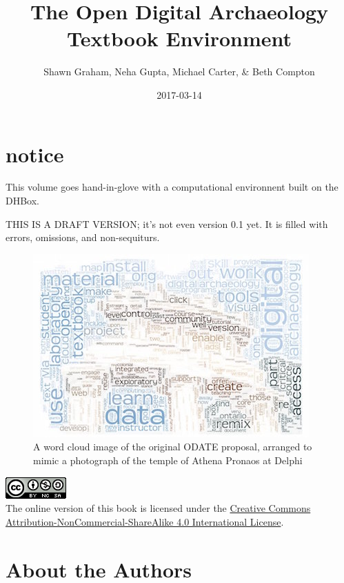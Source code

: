 \documentclass[english,]{book}
\title{The Open Digital Archaeology Textbook Environment}
\author{Shawn Graham, Neha Gupta, Michael Carter, \& Beth Compton}
\date{2017-03-14}
\begin{document}
\maketitle

{
\setcounter{tocdepth}{1}
\tableofcontents
}
\chapter*{notice}\label{notice}

This volume goes hand-in-glove with a computational environnent built on
the DHBox.

THIS IS A DRAFT VERSION; it's not even version 0.1 yet. It is filled
with errors, omissions, and non-sequiturs.

\begin{figure}[htbp]
\centering
\includegraphics{images/word-cloud-proposal.jpg}
\caption{A word cloud image of the original ODATE proposal, arranged to
mimic a photograph of the temple of Athena Pronaos at Delphi}
\end{figure}

\includegraphics{images/by-nc-sa.png}\\
The online version of this book is licensed under the
\href{http://creativecommons.org/licenses/by-nc-sa/4.0/}{Creative
Commons Attribution-NonCommercial-ShareAlike 4.0 International License}.

\chapter*{About the Authors}\label{about-the-authors}
\end{document}
